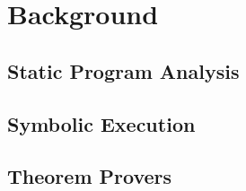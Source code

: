 
\chapter{Background}\label{c:background}

\section{Static Program Analysis}

\section{Symbolic Execution}

\section{Theorem Provers}

